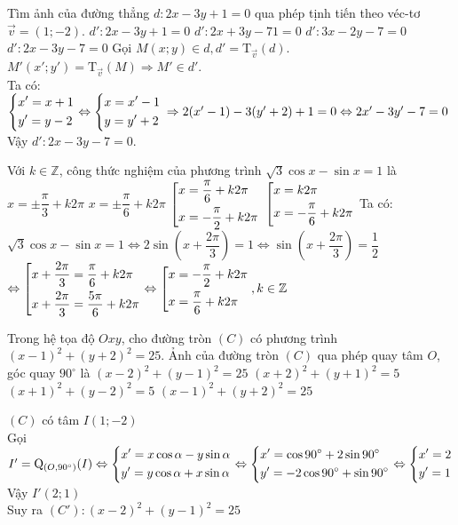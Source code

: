 \begin{ex}%
 Tìm ảnh của đường thẳng $d:2x-3y+1=0$ qua phép tịnh tiến theo véc-tơ $\vec{v}=(1;-2)$.
 \choice
  {$d':2x-3y+1=0$}
  {$d':2x+3y-71=0$}
  {$d':3x-2y-7=0$}
  {\True $d':2x-3y-7=0$}
 \loigiai
 {
 Gọi $M(x;y) \in d, d' = \mathrm{T}_{\vec{v}}(d)$.\\
 $M'(x';y') = \mathrm{T}_{\vec{v}}(M) \Rightarrow M' \in d'$.\\
 Ta có:
 $\left\{\begin{aligned}& x' = x + 1 \\& y' = y -2\end{aligned}\right. \Leftrightarrow    \left\{\begin{aligned}& x = x' -1 \\& y = y' + 2\end{aligned}\right. \\
 \Rightarrow 2(x'-1)-3(y'+2)+1=0 \Leftrightarrow 2x'-3y'-7=0$\\
 Vậy $d':2x-3y-7=0$.
  }
\end{ex}

\begin{ex}%
 Với $k \in \mathbb{Z}$, công thức nghiệm của phương trình $\sqrt{3} \cos x - \sin x = 1$ là
 \choice
  {$x = \pm \dfrac{\pi}{3}+k2\pi$}
  {$x = \pm \dfrac{\pi}{6}+k2\pi$}
  {\True $\left[\begin{aligned}& x = \dfrac{\pi}{6}+k2\pi \\& x = -\dfrac{\pi}{2}+k2\pi\end{aligned}\right.$}
  {$\left[\begin{aligned}& x = k2\pi \\& x = -\dfrac{\pi}{6}+k2\pi\end{aligned}\right.$}
 \loigiai
 {
 Ta có: $\sqrt{3} \cos x - \sin x = 1 \Leftrightarrow 2\sin {\left(x+\dfrac{2\pi}{3}\right)} = 1 \Leftrightarrow \sin {\left(x+\dfrac{2\pi}{3}\right)} = \dfrac{1}{2}$\\
 $\Leftrightarrow \left[\begin{aligned}& x+\dfrac{2\pi}{3} =\dfrac{\pi}{6}+k2\pi \\ & x+\dfrac{2\pi}{3} =\dfrac{5\pi}{6}+k2\pi\end{aligned}\right.
 \Leftrightarrow \left[\begin{aligned}& x = -\dfrac{\pi}{2}+k2\pi \\ & x =\dfrac{\pi}{6}+k2\pi\end{aligned}\right. , k\in \mathbb{Z}$
 }
\end{ex}

\begin{ex}%
 Trong hệ tọa độ $Oxy$, cho đường tròn $(C)$ có phương trình $(x-1)^2+(y+2)^2=25$. Ảnh của đường tròn $(C)$ qua phép quay tâm $O$, góc quay $90^{\circ}$ là
 \choice
  {\True $(x-2)^2+(y-1)^2=25$}
  {$(x+2)^2+(y+1)^2=5$}
  {$(x+1)^2+(y-2)^2=5$}
  {$(x-1)^2+(y+2)^2=25$}
 \loigiai
 {
 $(C)$ có tâm $I(1;-2)$\\
 Gọi $I'=\mathrm{Q}_{\left(O,90^{\circ}\right)}(I) 
\Leftrightarrow \left\{\begin{aligned}&x'=x\cos{\alpha}-y\sin{\alpha} \\&y'=y\cos{\alpha}+x\sin{\alpha}\end{aligned}\right. \Leftrightarrow \left\{\begin{aligned}&x'=\cos{90^{\circ}}+2\sin{90^{\circ}} \\&y'=-2\cos{90^{\circ}}+\sin{90^{\circ}}\end{aligned}\right. \Leftrightarrow \left\{\begin{aligned}&x'=2 \\&y'=1\end{aligned}\right. $\\
Vậy $I'(2;1)$\\
 Suy ra $(C'):(x-2)^2+(y-1)^2=25$

 }
\end{ex}

